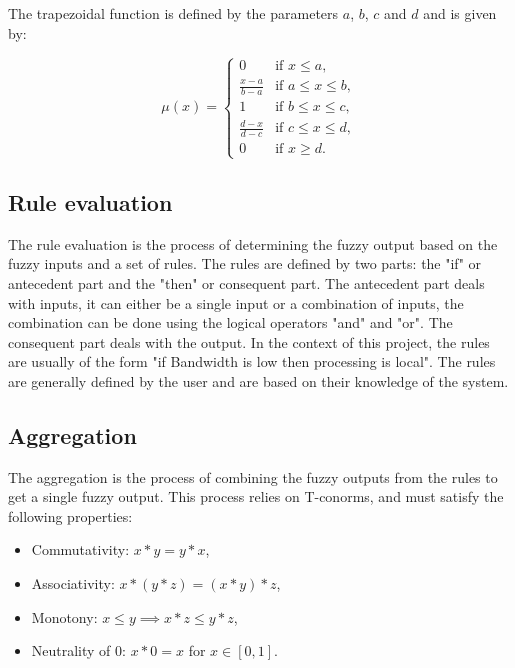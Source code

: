 The trapezoidal function is defined by the parameters $a$, $b$, $c$ and $d$ and is given by:

\begin{equation}
	\mu(x) = \begin{cases}
		0                   & \text{if } x \leq a,        \\
		\frac{x - a}{b - a} & \text{if } a \leq x \leq b, \\
		1                   & \text{if } b \leq x \leq c, \\
		\frac{d - x}{d - c} & \text{if } c \leq x \leq d, \\
		0                   & \text{if } x \geq d.
	\end{cases}
\end{equation}

\subsection{Rule evaluation}

The rule evaluation is the process of determining the fuzzy output based on the fuzzy inputs and a set of rules. The
rules are defined by two parts: the "if" or antecedent part and the "then" or consequent part. The antecedent part
deals with inputs, it can either be a single input or a combination of inputs, the combination can be done using the
logical operators "and" and "or". The consequent part deals with the output. In the context of this project, the rules
are usually of the form "if Bandwidth is low then processing is local". The rules are generally defined by the user
and are based on their knowledge of the system.

\subsection{Aggregation}

The aggregation is the process of combining the fuzzy outputs from the rules to get a single fuzzy output. This process
relies on T-conorms, and must satisfy the following properties:

\begin{itemize}
	\item Commutativity: $x * y = y * x$,
	\item Associativity: $x * (y * z) = (x * y) * z$,
	\item Monotony: $x \leq y \implies x * z \leq y * z$,
	\item Neutrality of 0: $x * 0 = x$ for $x \in [0, 1]$.
\end{itemize}

